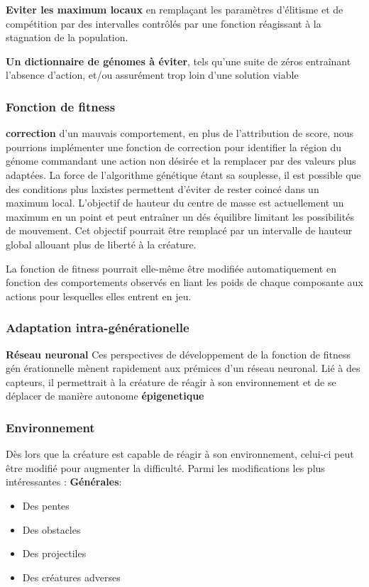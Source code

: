 \documentclass[journal, a4paper]{IEEEtran}
\begin{document}
	\textbf{Eviter les maximum locaux} en remplaçant les paramètres
	d'élitisme et de compétition par des intervalles contrôlés par une
	fonction réagissant à la stagnation de la population.

	\textbf{Un dictionnaire de génomes à éviter}, tels qu'une suite
	de zéros
	entraînant l'absence d'action, et/ou assurément trop loin d'une
	solution viable
\subsubsection{Fonction de fitness}
	\textbf{correction} d'un mauvais comportement, en plus de
	l'attribution	de score, nous
	pourrions implémenter une fonction de correction pour identifier
	la région du génome commandant une action non désirée et la
	remplacer par des valeurs plus adaptées.
	La force de l'algorithme génétique étant sa souplesse, il est possible
	que des conditions plus laxistes permettent d'éviter de rester coincé
	dans un maximum local.
	L'objectif de hauteur du centre de masse est
	actuellement un maximum en un point et peut entraîner un dés
	équilibre limitant les possibilités de mouvement.
	Cet objectif pourrait être remplacé par	un intervalle de hauteur
	global allouant plus de liberté à la créature.

	La fonction de fitness pourrait elle-même être modifiée
	automatiquement en fonction des comportements observés en liant
	les poids de chaque composante aux actions pour lesquelles elles
	entrent en jeu.
	\subsubsection{Adaptation intra-générationelle}
\textbf{Réseau neuronal}
	Ces perspectives de développement de la fonction de fitness gén
	érationnelle
	mènent rapidement aux prémices d'un réseau neuronal.
	Lié à des capteurs, il permettrait à la créature de réagir
	à son environnement et de se déplacer de manière autonome
	\textbf{épigenetique}


\subsubsection{Environnement}
	Dès lors que la créature est capable de réagir à son environnement,
	celui-ci peut être modifié pour augmenter la difficulté.
	Parmi les modifications les plus intéressantes :
	\textbf{Générales}:
	\begin{itemize}
			\item Des pentes
			\item Des obstacles
			\item Des projectiles
			\item Des créatures adverses
		\end{itemize}
\end{document}
